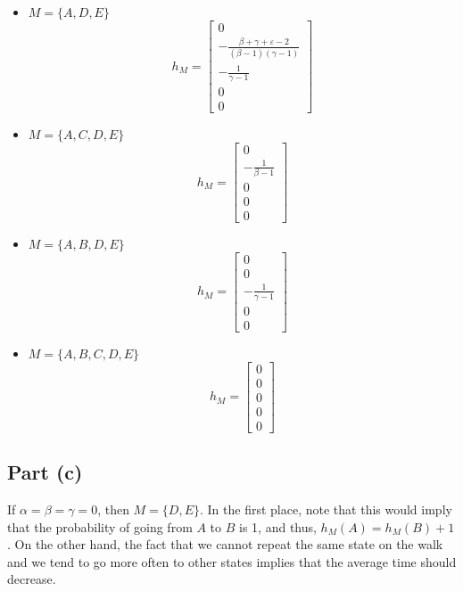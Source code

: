 \begin{itemize}
\[    \]
    \item $M = \{A,D,E\}$
    \[ h_M = \left[\begin{matrix}0\\- \frac{\beta + \gamma + \varepsilon - 2}{\left(\beta - 1\right) \left(\gamma - 1\right)}\\- \frac{1}{\gamma - 1}\\0\\0\end{matrix}\right]
    \]
    \item $M = \{A,C,D,E\}$
    \[ h_M = \left[\begin{matrix}0\\- \frac{1}{\beta - 1}\\0\\0\\0\end{matrix}\right]
    \]
    \item $M = \{A,B,D,E\}$
    \[ h_M = \left[\begin{matrix}0\\0\\- \frac{1}{\gamma - 1}\\0\\0\end{matrix}\right]
    \]
    \item $M = \{A,B,C,D,E\}$
    \[ h_M = \left[\begin{matrix}0\\0\\0\\0\\0\end{matrix}\right]
    \]
\end{itemize}

\subsection*{Part (c)}

If $\alpha = \beta = \gamma = 0$, then $M = \{D,E\}$. In the first place, note that this would imply that the probability of going from $A$ to $B$ is 1, and thus, $h_M(A) = h_M(B)+1$. On the other hand, the fact that we cannot repeat the same state on the walk and we tend to go more often to other states implies that the average time should decrease.
